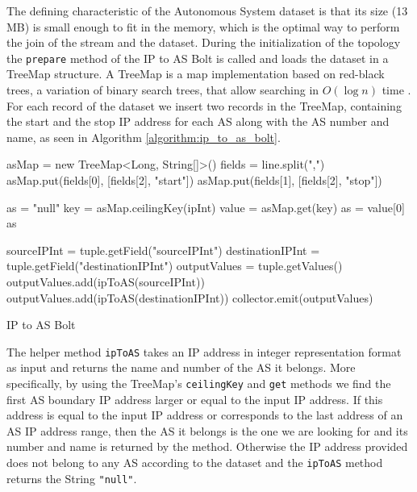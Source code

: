 The defining characteristic of the Autonomous System dataset is that its size (13 MB) is small enough to fit in the memory, which is the optimal way to perform the join of the stream and the dataset. During the initialization of the topology the \texttt{prepare} method of the IP to AS Bolt is called and loads the dataset in a TreeMap structure. A TreeMap is a map implementation based on red-black trees, a variation of binary search trees, that allow searching in $O(\log{n})$ time \cite{treemap}. For each record of the dataset we insert two records in the TreeMap, containing the start and the stop IP address for each AS along with the AS number and name, as seen in Algorithm \ref{algorithm:ip_to_as_bolt}.

\begin{algorithm}[H]
\begin{algorithmic}[1]
\State asMap = new TreeMap<Long, String[]>()
\State fields = line.split(",")
\State asMap.put(fields[0], [fields[2], "start"])
\State asMap.put(fields[1], [fields[2], "stop"])
\EndFor
\EndFunction

\State as = "null"
\State key = asMap.ceilingKey(ipInt)
\State value = asMap.get(key)
\State as = value[0]
\EndIf
\EndIf
\Return as
\EndFunction

\State sourceIPInt = tuple.getField("sourceIPInt")
\State destinationIPInt = tuple.getField("destinationIPInt")
\State outputValues = tuple.getValues()
\State outputValues.add(ipToAS(sourceIPInt))
\State outputValues.add(ipToAS(destinationIPInt))
\State collector.emit(outputValues)
\EndFunction
\end{algorithmic}
\caption{IP to AS Bolt}
\label{algorithm:ip_to_as_bolt}
\end{algorithm}

The helper method \texttt{ipToAS} takes an IP address in integer representation format as input and returns the name and number of the AS it belongs. More specifically, by using the TreeMap's \texttt{ceilingKey} and \texttt{get} methods we find the first AS boundary IP address larger or equal to the input IP address. If this address is equal to the input IP address or corresponds to the last address of an AS IP address range, then the AS it belongs is the one we are looking for and its number and name is returned by the method. Otherwise the IP address provided does not belong to any AS according to the dataset and the \texttt{ipToAS} method returns the String \texttt{"null"}.

